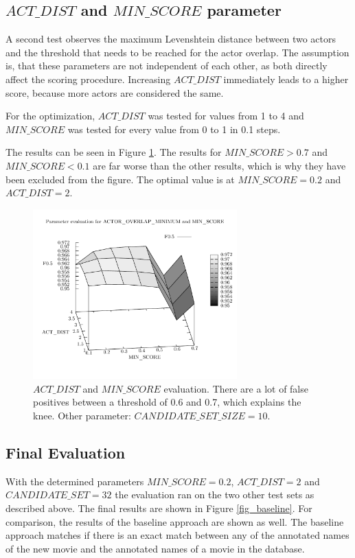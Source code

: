 \subsection{$ACT\_DIST$ and $MIN\_SCORE$ parameter}
A second test observes the maximum Levenshtein distance between two actors and the threshold that needs to be reached for the actor overlap.
The assumption is, that these parameters are not independent of each other, as both directly affect the scoring procedure.
Increasing $ACT\_DIST$ immediately leads to a higher score, because more actors are considered the same.

For the optimization, $ACT\_DIST$ was tested for values from 1 to 4 and $MIN\_SCORE$ was tested for every value from 0 to 1 in 0.1 steps.

The results can be seen in Figure \ref{fig_3d}.
The results for $MIN\_SCORE > 0.7$ and $MIN\_SCORE < 0.1$ are far worse than the other results, which is why they have been excluded from the figure.
The optimal value is at $MIN\_SCORE = 0.2$ and $ACT\_DIST = 2$.

\begin{figure}[h!]
  \begin{center}
  \includegraphics[width=0.7\textwidth]{images/3d.pdf}
  \end{center}
  \caption{$ACT\_DIST$  and $MIN\_SCORE$ evaluation. There are a lot of false positives between a threshold of 0.6 and 0.7, which explains the knee. Other parameter: $CANDIDATE\_SET\_SIZE = 10$.}
  \label{fig_3d}
\end{figure}

\subsection{Final Evaluation}
With the determined parameters $MIN\_SCORE = 0.2$, $ACT\_DIST = 2$ and $CANDIDATE\_SET = 32$ the evaluation ran on the two other test sets as described above.
The final results are shown in Figure \ref{fig_baseline}.
For comparison, the results of the baseline approach are shown as well.
The baseline approach matches if there is an exact match between any of the annotated names of the new movie and the annotated names of a movie in the database.


